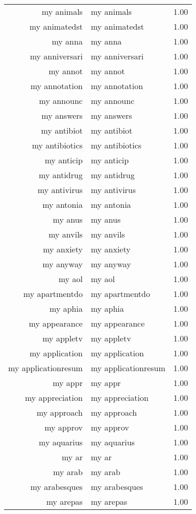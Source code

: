 \begin{table}[ht]
\begin{tabular}{rlr}
  my animals & my animals & 1.00 \\ 
  my animatedst & my animatedst & 1.00 \\ 
  my anna & my anna & 1.00 \\ 
  my anniversari & my anniversari & 1.00 \\ 
  my annot & my annot & 1.00 \\ 
  my annotation & my annotation & 1.00 \\ 
  my announc & my announc & 1.00 \\ 
  my answers & my answers & 1.00 \\ 
  my antibiot & my antibiot & 1.00 \\ 
  my antibiotics & my antibiotics & 1.00 \\ 
  my anticip & my anticip & 1.00 \\ 
  my antidrug & my antidrug & 1.00 \\ 
  my antivirus & my antivirus & 1.00 \\ 
  my antonia & my antonia & 1.00 \\ 
  my anus & my anus & 1.00 \\ 
  my anvils & my anvils & 1.00 \\ 
  my anxiety & my anxiety & 1.00 \\ 
  my anyway & my anyway & 1.00 \\ 
  my aol & my aol & 1.00 \\ 
  my apartmentdo & my apartmentdo & 1.00 \\ 
  my aphia & my aphia & 1.00 \\ 
  my appearance & my appearance & 1.00 \\ 
  my appletv & my appletv & 1.00 \\ 
  my application & my application & 1.00 \\ 
  my applicationresum & my applicationresum & 1.00 \\ 
  my appr & my appr & 1.00 \\ 
  my appreciation & my appreciation & 1.00 \\ 
  my approach & my approach & 1.00 \\ 
  my approv & my approv & 1.00 \\ 
  my aquarius & my aquarius & 1.00 \\ 
  my ar & my ar & 1.00 \\ 
  my arab & my arab & 1.00 \\ 
  my arabesques & my arabesques & 1.00 \\ 
  my arepas & my arepas & 1.00 \\ 

\end{tabular}
\end{table}
